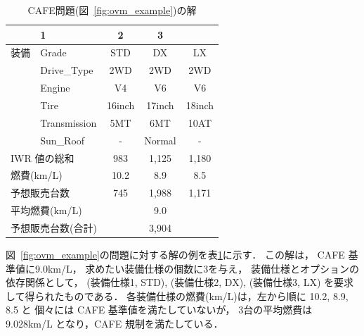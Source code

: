 \begin{table}[t]
  \centering
  \caption{CAFE問題(図~\ref{fig:ovm_example})の解}
  \begin{tabular}{l|l|c|c|c} \bhline
    \multicolumn{2}{l|}{装備仕様}               & 1	& 2 	 & 3	\\  \hline
    装備 & \textsf{Grade}        & \textsf{STD}    & \textsf{DX}     & \textsf{LX}\\
    &\textsf{Drive\_Type}  & \textsf{2WD}    & \textsf{2WD}    & \textsf{2WD}\\
    &\textsf{Engine}	  & \textsf{V4}     & \textsf{V6}     & \textsf{V6}\\
    &\textsf{Tire}	  & \textsf{16inch} & \textsf{17inch} & \textsf{18inch}\\
    &\textsf{Transmission} & \textsf{5MT}    & \textsf{6MT}    & \textsf{10AT}\\
    &\textsf{Sun\_Roof}    & -               & \textsf{Normal} & -  \\ \hline
    \multicolumn{2}{l|}{IWR 値の総和}           & 983  & 1,125   & 1,180 \\ %
    \multicolumn{2}{l|}{燃費(km/L)}      & 10.2  & 8.9     & 8.5 \\ %
    \multicolumn{2}{l|}{予想販売台数}    & 745   & 1,988   & 1,171  \\ \hline
    \multicolumn{2}{l|}{平均燃費(km/L)}  & \multicolumn{3}{c}{9.0} \\ 
    \multicolumn{2}{l|}{予想販売台数(合計)}  & \multicolumn{3}{c}{3,904} \\ \hline
 \end{tabular}
 \label{tab:ovm_ans}
\end{table}

図~\ref{fig:ovm_example}の問題に対する解の例を表\ref{tab:ovm_ans}に示す．
この解は，
CAFE 基準値に9.0km/L，
求めたい装備仕様の個数に3を与え，
装備仕様とオプションの依存関係として，
(装備仕様1, \textsf{STD}),
(装備仕様2, \textsf{DX}),
(装備仕様3, \textsf{LX})
を要求して得られたものである．
各装備仕様の燃費(km/L)は，左から順に 10.2, 8.9, 8.5 と
個々には CAFE 基準値を満たしていないが，
3台の平均燃費は 9.028km/L となり，CAFE 規制を満たしている．


